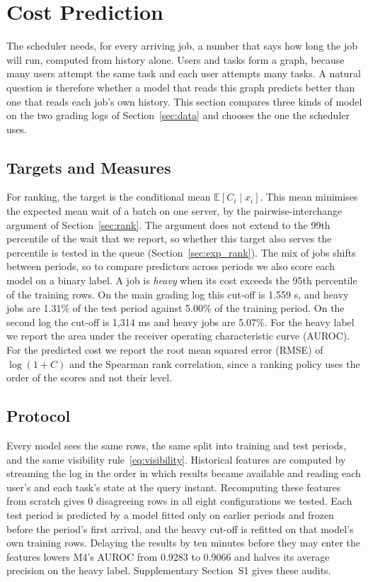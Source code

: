 \providecommand{\devnum}[1]{#1}

\section{Cost Prediction}
\label{sec:prediction}

The scheduler needs, for every arriving job, a number that says how long the job will run,
computed from history alone. Users and tasks form a graph, because many users attempt the
same task and each user attempts many tasks. A natural question is therefore whether a
model that reads this graph predicts better than one that reads each job's own history.
This section compares three kinds of model on the two grading logs of
Section~\ref{sec:data} and chooses the one the scheduler uses.

\subsection{Targets and Measures}

For ranking, the target is the conditional mean $\mathbb{E}[C_i \mid x_i]$. This mean
minimises the expected mean wait of a batch on one server, by the pairwise-interchange
argument of Section~\ref{sec:rank}. The argument does not extend to the 99th percentile of
the wait that we report, so whether this target also serves the percentile is tested in the
queue (Section~\ref{sec:exp_rank}). The mix of jobs shifts between periods, so to compare predictors
across periods we also score each model on a binary label. A job is \emph{heavy} when its
cost exceeds the 95th percentile of the training rows. On the main grading log this cut-off
is \devnum{1.559} s, and heavy jobs are \devnum{1.31\%} of the test period against
\devnum{5.00\%} of the training period. On the second log the cut-off is \devnum{1{,}314}
ms and heavy jobs are \devnum{5.07\%}. For the heavy label we report the area under the
receiver operating characteristic curve (AUROC). For the predicted cost we report the root
mean squared error (RMSE) of $\log(1+C)$ and the Spearman rank correlation, since a ranking
policy uses the order of the scores and not their level.

\subsection{Protocol}
\label{sec:pred_visibility}

Every model sees the same rows, the same split into training and test periods, and the
same visibility rule~\eqref{eq:visibility}. Historical features are computed by streaming
the log in the order in which results became available and reading each user's and each
task's state at the query instant. Recomputing these features from scratch gives
\devnum{0} disagreeing rows in all eight configurations we tested. Each test period is
predicted by a model fitted only on earlier periods and frozen before the period's first
arrival, and the heavy cut-off is refitted on that model's own training rows. Delaying the
results by ten minutes before they may enter the features lowers M4's AUROC from
\devnum{0.9283} to \devnum{0.9066} and halves its average precision on the heavy label.
Supplementary Section~S1 gives these audits.

